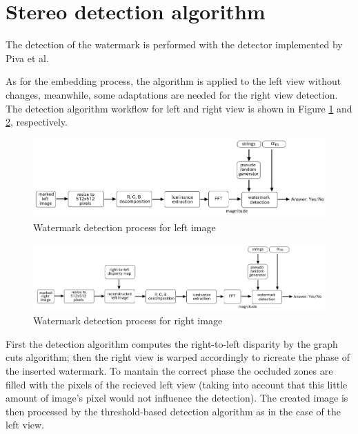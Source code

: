 \section{Stereo detection algorithm}

The detection of the watermark is performed with the detector implemented by Piva et al.\newline

As for the embedding process, the algorithm is applied to the left view without changes, meanwhile, some adaptations are needed for the right view detection. The detection algorithm workflow for left and right view is shown in Figure \ref{fig:left_dec} and \ref{fig:right_dec}, respectively. \newline

\begin{figure}[h!]
\centering
\includegraphics[width=1\textwidth]{./img/left_det.png}
\caption{\small{Watermark detection process for left image}\label{fig:left_dec}}

\end{figure}

\begin{figure}[h!]
\centering
\includegraphics[width=1\textwidth]{./img/right_det.png}
\caption{\small{Watermark detection process for right image}\label{fig:right_dec}}

\end{figure}



First the detection algorithm computes the right-to-left disparity by the graph cuts algorithm; then the right view is warped accordingly to ricreate the phase of the inserted watermark. To mantain the correct phase the occluded zones are filled with the pixels of the recieved left view (taking into account that this little amount of image's pixel would not influence the detection).\newline
The created image is then processed by the threshold-based detection algorithm as in the case of the left view.\newline 

